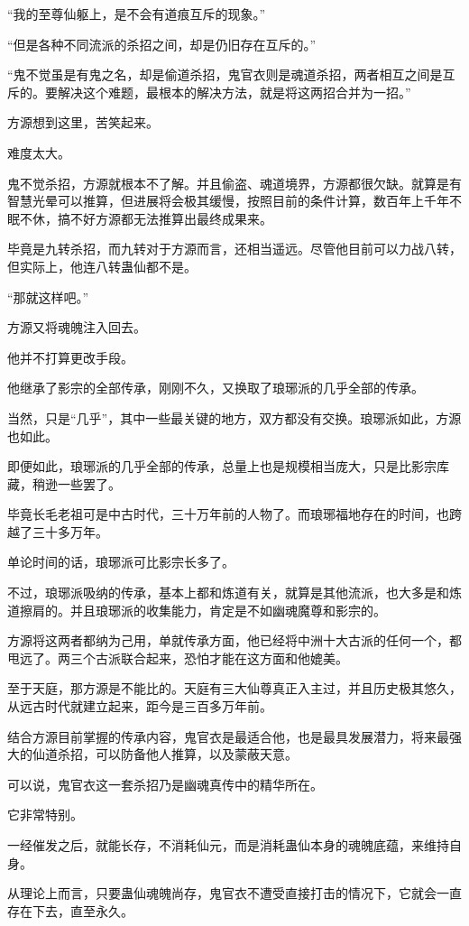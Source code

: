 \begin{this_body}
“我的至尊仙躯上，是不会有道痕互斥的现象。”

“但是各种不同流派的杀招之间，却是仍旧存在互斥的。”

“鬼不觉虽是有鬼之名，却是偷道杀招，鬼官衣则是魂道杀招，两者相互之间是互斥的。要解决这个难题，最根本的解决方法，就是将这两招合并为一招。”

方源想到这里，苦笑起来。

难度太大。

鬼不觉杀招，方源就根本不了解。并且偷盗、魂道境界，方源都很欠缺。就算是有智慧光晕可以推算，但进展将会极其缓慢，按照目前的条件计算，数百年上千年不眠不休，搞不好方源都无法推算出最终成果来。

毕竟是九转杀招，而九转对于方源而言，还相当遥远。尽管他目前可以力战八转，但实际上，他连八转蛊仙都不是。

“那就这样吧。”

方源又将魂魄注入回去。

他并不打算更改手段。

他继承了影宗的全部传承，刚刚不久，又换取了琅琊派的几乎全部的传承。

当然，只是“几乎”，其中一些最关键的地方，双方都没有交换。琅琊派如此，方源也如此。

即便如此，琅琊派的几乎全部的传承，总量上也是规模相当庞大，只是比影宗库藏，稍逊一些罢了。

毕竟长毛老祖可是中古时代，三十万年前的人物了。而琅琊福地存在的时间，也跨越了三十多万年。

单论时间的话，琅琊派可比影宗长多了。

不过，琅琊派吸纳的传承，基本上都和炼道有关，就算是其他流派，也大多是和炼道擦肩的。并且琅琊派的收集能力，肯定是不如幽魂魔尊和影宗的。

方源将这两者都纳为己用，单就传承方面，他已经将中洲十大古派的任何一个，都甩远了。两三个古派联合起来，恐怕才能在这方面和他媲美。

至于天庭，那方源是不能比的。天庭有三大仙尊真正入主过，并且历史极其悠久，从远古时代就建立起来，距今是三百多万年前。

结合方源目前掌握的传承内容，鬼官衣是最适合他，也是最具发展潜力，将来最强大的仙道杀招，可以防备他人推算，以及蒙蔽天意。

可以说，鬼官衣这一套杀招乃是幽魂真传中的精华所在。

它非常特别。

一经催发之后，就能长存，不消耗仙元，而是消耗蛊仙本身的魂魄底蕴，来维持自身。

从理论上而言，只要蛊仙魂魄尚存，鬼官衣不遭受直接打击的情况下，它就会一直存在下去，直至永久。


\end{this_body}
